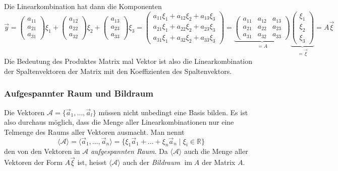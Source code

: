 Die Linearkombination hat dann die Komponenten
\[
\vec{y}
=
\begin{pmatrix}a_{11}\\a_{21}\\a_{31}\end{pmatrix}
\xi_1
+
\begin{pmatrix}a_{12}\\a_{22}\\a_{32}\end{pmatrix}
\xi_2
+
\begin{pmatrix}a_{13}\\a_{23}\\a_{33}\end{pmatrix}
\xi_3
=
\begin{pmatrix}
a_{11}\xi_1+a_{12}\xi_2+a_{13}\xi_3\\
a_{21}\xi_1+a_{22}\xi_2+a_{23}\xi_3\\
a_{31}\xi_1+a_{32}\xi_2+a_{33}\xi_3
\end{pmatrix}
=
\underbrace{
\begin{pmatrix}
a_{11}&a_{12}&a_{13}\\
a_{21}&a_{22}&a_{23}\\
a_{31}&a_{32}&a_{33}
\end{pmatrix}}_{\displaystyle=A}
\underbrace{
\begin{pmatrix}
\xi_1\\\xi_2\\\xi_3
\end{pmatrix}}_{\displaystyle=\vec{\xi}}
=
A\vec{\xi}
\]
Die Bedeutung des Produktes Matrix mal Vektor ist also die Linearkombination
der Spaltenvektoren der Matrix mit den Koeffizienten des Spaltenvektors.

\subsubsection{Aufgespannter Raum und Bildraum}
Die Vektoren $\mathcal{A}=\{\vec{a}_1,\dots,\vec{a}_l\}$ müssen nicht
unbedingt eine Basis bilden.
Es ist also durchaus möglich, dass die Menge aller Linearkombinationen
nur eine Telmenge des Raums aller Vektoren ausmacht.
Man nennt
\[
\langle
\mathcal{A}
\rangle
=
\langle
\vec{a}_1,\dots,\vec{a}_n
\rangle
=
\{
\xi_1\vec{a}_1+\dots+\xi_n\vec{a}_n\;|\; \xi_i\in\mathbb R
\}
\]
den von den Vektoren in $\mathcal{A}$ {\em aufgespannten Raum}.
Da $\langle\mathcal{A}\rangle$ auch die Menge aller Vektoren der
Form $A\vec{\xi}$ ist, heisst $\langle\mathcal{A}\rangle$
auch der {\em Bildraum} $\operatorname{im}A$ der Matrix $A$.

